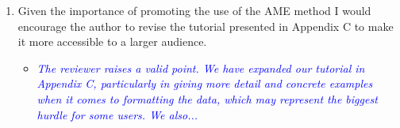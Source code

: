 \begin{enumerate}
\begin{itemize}
{{		}}
	\end{itemize}
	\item Given the importance of promoting the use of the AME method I would encourage the author to revise the tutorial presented in Appendix C to make it more accessible to a larger audience.
	\begin{itemize}
		\item \textcolor{blue}{ \emph{
		The reviewer raises a valid point. We have expanded our tutorial in Appendix C, particularly in giving more detail and concrete examples when it comes to formatting the data, which may represent the biggest hurdle for some users. We also...
		}}
	\end{itemize}
\end{enumerate}
